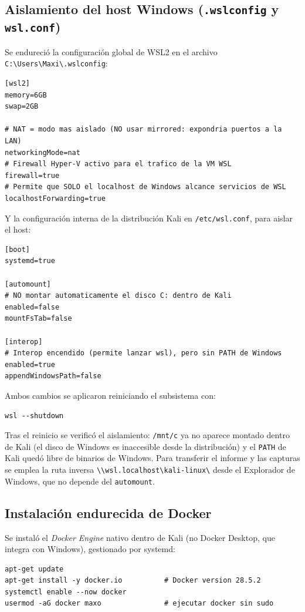 \documentclass[letter,12pt]{article}
\begin{document}
\subsection*{Aislamiento del host Windows (\texttt{.wslconfig} y \texttt{wsl.conf})}
Se endureció la configuración global de WSL2 en el archivo \texttt{C:\textbackslash Users\textbackslash Maxi\textbackslash .wslconfig}:
\begin{verbatim}
[wsl2]
memory=6GB
swap=2GB

# NAT = modo mas aislado (NO usar mirrored: expondria puertos a la LAN)
networkingMode=nat
# Firewall Hyper-V activo para el trafico de la VM WSL
firewall=true
# Permite que SOLO el localhost de Windows alcance servicios de WSL
localhostForwarding=true
\end{verbatim}

Y la configuración interna de la distribución Kali en \texttt{/etc/wsl.conf}, para aislar el host:
\begin{verbatim}
[boot]
systemd=true

[automount]
# NO montar automaticamente el disco C: dentro de Kali
enabled=false
mountFsTab=false

[interop]
# Interop encendido (permite lanzar wsl), pero sin PATH de Windows
enabled=true
appendWindowsPath=false
\end{verbatim}

Ambos cambios se aplicaron reiniciando el subsistema con:
\begin{verbatim}
wsl --shutdown
\end{verbatim}

Tras el reinicio se verificó el aislamiento: \texttt{/mnt/c} ya no aparece montado dentro de Kali (el disco de Windows es inaccesible desde la distribución) y el \texttt{PATH} de Kali quedó libre de binarios de Windows. Para transferir el informe y las capturas se emplea la ruta inversa \texttt{\textbackslash\textbackslash wsl.localhost\textbackslash kali-linux\textbackslash} desde el Explorador de Windows, que no depende del \texttt{automount}.

\subsection*{Instalación endurecida de Docker}
Se instaló el \emph{Docker Engine} nativo dentro de Kali (no Docker Desktop, que integra con Windows), gestionado por systemd:
\begin{verbatim}
apt-get update
apt-get install -y docker.io          # Docker version 28.5.2
systemctl enable --now docker
usermod -aG docker maxo               # ejecutar docker sin sudo
\end{verbatim}
\end{document}
